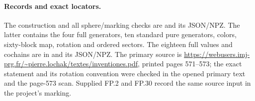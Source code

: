 \paragraph{Records and exact locators.}
The construction and all sphere/marking checks are
and its JSON/NPZ. The latter contains the four full
generators, ten standard pure generators, colors,
sixty-block map, rotation and ordered sectors.
The eighteen full values and cochains are in
 and
its JSON/NPZ. The primary source is
\url{https://webusers.imj-prg.fr/~pierre.lochak/textes/inventiones.pdf},
printed pages 571--573; the exact statement and its
rotation convention were checked in the opened primary
text and the page-573 scan. Supplied FP.2 and FP.30
record the same source input in the project's marking.
